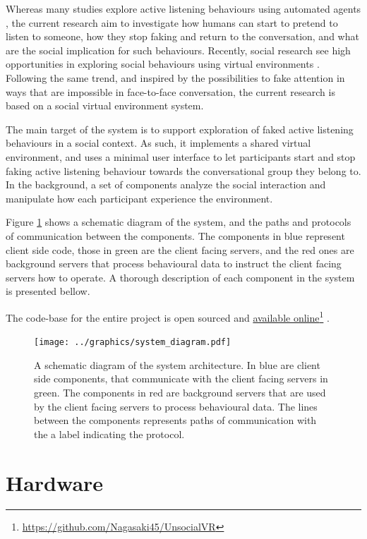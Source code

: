 \documentclass[]{simple-thesis}
\newcommand\fnurl[2]{%
  \href{#2}{#1}\footnote{\url{#2}}%
}
\begin{document}
Whereas many studies explore active listening behaviours using automated agents \citep{Bevacqua2008, Huang2011, Poppe2013}, the current research aim to investigate how humans can start to pretend to listen to someone, how they stop faking and return to the conversation, and what are the social implication for such behaviours.
Recently, social research see high opportunities in exploring social behaviours using virtual environments \citep{Bailenson2008}.
Following the same trend, and inspired by the possibilities to fake attention in ways that are impossible in face-to-face conversation, the current research is based on a social virtual environment system.

The main target of the system is to support exploration of faked active listening behaviours in a social context.
As such, it implements a shared virtual environment, and uses a minimal user interface to let participants start and stop faking active listening behaviour towards the conversational group they belong to.
In the background, a set of components analyze the social interaction and manipulate how each participant experience the environment.

Figure \ref{fig:system:diagram} shows a schematic diagram of the system, and the paths and protocols of communication between the components.
The components in blue represent client side code, those in green are the client facing servers, and the red ones are background servers that process behavioural data to instruct the client facing servers how to operate.
A thorough description of each component in the system is presented bellow.

The code-base for the entire project is open sourced and \fnurl{available online}{https://github.com/Nagasaki45/UnsocialVR}.

\begin{figure}
  \texttt{[image: ../graphics/system\_diagram.pdf]}
  \caption{A schematic diagram of the system architecture. In blue are client side components, that communicate with the client facing servers in green. The components in red are background servers that are used by the client facing servers to process behavioural data. The lines between the components represents paths of communication with the a label indicating the protocol.}
  \label{fig:system:diagram}
\end{figure}

\section{Hardware}
\end{document}
